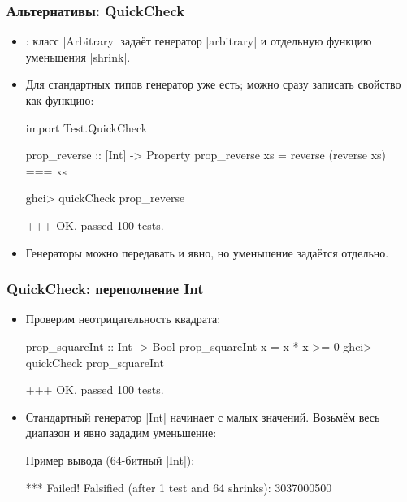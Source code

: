\documentclass[11pt]{beamer}
\begin{document}
\begin{frame}[fragile]
  \frametitle{Альтернативы: QuickCheck}
  \begin{itemize}
    \item {}: класс \haskinline|Arbitrary| задаёт генератор \haskinline|arbitrary| и отдельную функцию уменьшения \haskinline|shrink|.
    \item Для стандартных типов генератор уже есть; можно сразу записать свойство как функцию:
          \begin{haskellsmall}
            import Test.QuickCheck

            prop_reverse :: [Int] -> Property
            prop_reverse xs = reverse (reverse xs) === xs

            ghci> quickCheck prop_reverse
          \end{haskellsmall}
          \begin{ghcismall}
            +++ OK, passed 100 tests.
          \end{ghcismall}
    \item Генераторы можно передавать и явно, но уменьшение задаётся отдельно.
  \end{itemize}
\end{frame}

\begin{frame}[fragile]
  \frametitle{QuickCheck: переполнение Int}
  \begin{itemize}
    \item Проверим неотрицательность квадрата:
          \begin{haskellsmall}
            prop_squareInt :: Int -> Bool
            prop_squareInt x = x * x >= 0
            ghci> quickCheck prop_squareInt
          \end{haskellsmall}
          \pause
          \begin{ghcismall}
            +++ OK, passed 100 tests.
          \end{ghcismall}
    \item Стандартный генератор \haskinline|Int| начинает с малых значений. Возьмём весь диапазон и явно зададим уменьшение:
          \pause
          {\footnotesize Пример вывода (64-битный \haskinline|Int|):}
          \begin{ghcismall}
            *** Failed! Falsified (after 1 test and 64 shrinks):
            3037000500
          \end{ghcismall}
  \end{itemize}
\end{frame}
\end{document}
